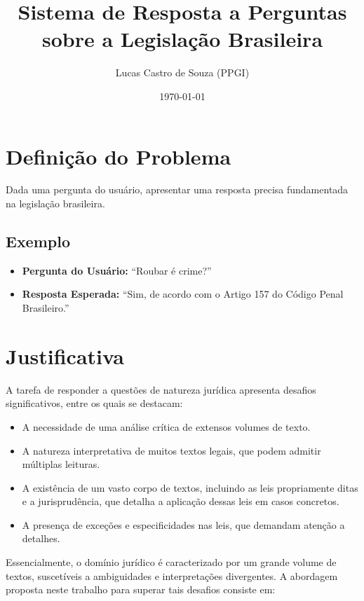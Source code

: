 \documentclass{article}
\title{Sistema de Resposta a Perguntas sobre a Legislação Brasileira}
\author{Lucas Castro de Souza (PPGI)}
\date{\today}
\begin{document}
\maketitle

\section{Definição do Problema}

Dada uma pergunta do usuário, apresentar uma resposta precisa fundamentada na legislação brasileira.

\subsection*{Exemplo}
\begin{itemize}
    \item \textbf{Pergunta do Usuário:} \enquote{Roubar é crime?}
    \item \textbf{Resposta Esperada:} \enquote{Sim, de acordo com o Artigo 157 do Código Penal Brasileiro.}
\end{itemize}

\section{Justificativa}

A tarefa de responder a questões de natureza jurídica apresenta desafios significativos, entre os quais se destacam:

\begin{itemize}
    \item A necessidade de uma análise crítica de extensos volumes de texto.
    \item A natureza interpretativa de muitos textos legais, que podem admitir múltiplas leituras.
    \item A existência de um vasto corpo de textos, incluindo as leis propriamente ditas e a jurisprudência, que detalha a aplicação dessas leis em casos concretos.
    \item A presença de exceções e especificidades nas leis, que demandam atenção a detalhes.
\end{itemize}

Essencialmente, o domínio jurídico é caracterizado por um grande volume de textos, suscetíveis a ambiguidades e interpretações divergentes. A abordagem proposta neste trabalho para superar tais desafios consiste em:
\end{document}
